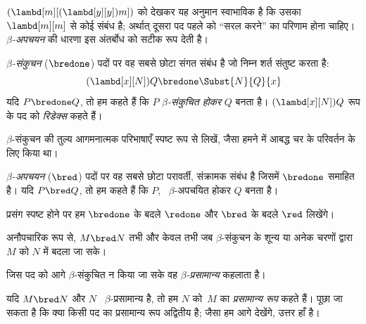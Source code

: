 \documentclass[../../../include/open-logic-section]{subfiles}
\begin{document}

$(\lambd[m][(\lambd[y][y]) m])$ को देखकर यह अनुमान स्वाभाविक है कि उसका
$\lambd[m][m]$ से कोई संबंध है; अर्थात् दूसरा पद पहले को ``सरल करने'' का
परिणाम होना चाहिए। \emph{$\beta$-अपचयन} की धारणा इस अंतर्बोध को सटीक रूप
देती है।

\begin{defn} 
  \emph{$\beta$-संकुचन} ($\bredone$) पदों पर वह सबसे छोटा संगत संबंध है
  जो निम्न शर्त संतुष्ट करता है:
  \[
    (\lambd[x][N])Q \bredone \Subst{N}{Q}{x} 
  \]
  यदि $P \bredone Q$, तो हम कहते हैं कि $P$ \emph{$\beta$-संकुचित होकर}
  $Q$ बनता है। $(\lambd[x][N])Q$ रूप के पद को \emph{रिडेक्स} कहते हैं।
\end{defn}

\begin{prob} 
  $\beta$-संकुचन की तुल्य आगमनात्मक परिभाषाएँ स्पष्ट रूप से लिखें, जैसा
  हमने  में आबद्ध चर के परिवर्तन के लिए
  किया था।
\end{prob}
  
\begin{defn} 
  \emph{$\beta$-अपचयन} ($\bred$) पदों पर वह सबसे छोटा परावर्ती, संक्रामक
  संबंध है जिसमें $\bredone$ समाहित है। यदि $P \bred Q$, तो हम कहते हैं
  कि $P$, ~$\beta$-अपचयित होकर $Q$ बनता है।
\end{defn}

प्रसंग स्पष्ट होने पर हम $\bredone$ के बदले $\redone$ और $\bred$ के बदले
$\red$ लिखेंगे।

अनौपचारिक रूप से, $M \bred N$ तभी और केवल तभी जब $\beta$-संकुचन के शून्य
या अनेक चरणों द्वारा $M$ को $N$ में बदला जा सके।

\begin{defn}[$\beta$-प्रसामान्य]
जिस पद को आगे $\beta$-संकुचित न किया जा सके वह
\emph{$\beta$-प्रसामान्य} कहलाता है।
\end{defn}

यदि $M \bred N$ और $N$ ~$\beta$-प्रसामान्य है, तो हम $N$ को~$M$ का
\emph{प्रसामान्य रूप} कहते हैं। पूछा जा सकता है कि क्या किसी पद का
प्रसामान्य रूप अद्वितीय है; जैसा हम आगे देखेंगे, उत्तर हाँ है।
\end{document}
